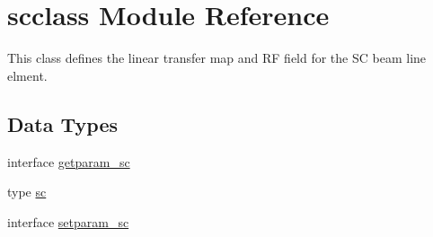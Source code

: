\hypertarget{namespacescclass}{}\section{scclass Module Reference}
\label{namespacescclass}


This class defines the linear transfer map and RF field for the SC beam line elment.  


\subsection*{Data Types}
\begin{DoxyCompactItemize}
\item 
interface \mbox{\hyperlink{interfacescclass_1_1getparam__sc}{getparam\+\_\+sc}}
\item 
type \mbox{\hyperlink{namespacescclass_structscclass_1_1sc}{sc}}
\item 
interface \mbox{\hyperlink{interfacescclass_1_1setparam__sc}{setparam\+\_\+sc}}
\end{DoxyCompactItemize}
